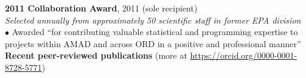 \documentclass[11pt]{article}
\def\newsectn{\vspace*{0.6cm}}
\def\newitem{\vspace*{0.2cm}}
\begin{document}
\newitem
\textbf{2011 Collaboration Award}, 2011 (sole recipient)\\
\textit{Selected annually from approximately 50 scientific staff in former EPA division}\\
$\bullet$ Awarded ``for contributing valuable statistical and programming
expertise to projects within AMAD and across ORD in a positive and professional
manner''\\











\newsectn
{\Large \textbf{Recent peer-reviewed publications}} (more at
\url{https://orcid.org/0000-0001-8728-5771})

\end{document}
